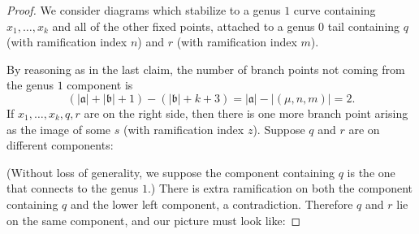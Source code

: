 \documentclass[11pt]{article}           %
\renewcommand{\a}{\mathfrak a}
\renewcommand{\b}{\mathfrak b}
\theoremstyle{definition}
\theoremstyle{definition}
\begin{document}
\begin{proof}
    We consider diagrams which stabilize to a genus $1$ curve containing $x_1,\dots,x_k$ and all 
  of the other fixed points, attached to a genus $0$ tail containing $q$ (with ramification index $n$) and $r$
  (with ramification index $m$).
  
  By reasoning as in the last claim, the number of branch points not coming from the genus $1$ component is
  \[
  (|\mathfrak a|+|\mathfrak b|+1)-(|\b|+k+3)=|\a|-|(\mu,n,m)|=2.
  \]
  If $x_1,\dots,x_k,q,r$ are on the right side, then there is one more branch point arising as the image of some $s$ (with
  ramification index $z$). Suppose $q$ and $r$ are on different components:


  (Without loss of generality, we suppose the component containing $q$ is the one that connects to the genus $1$.)
  There is extra ramification on both the component containing $q$ and the lower left component, a contradiction. Therefore
  $q$ and $r$ lie on the same component, and our picture must look like:


\end{proof}
\end{document}

